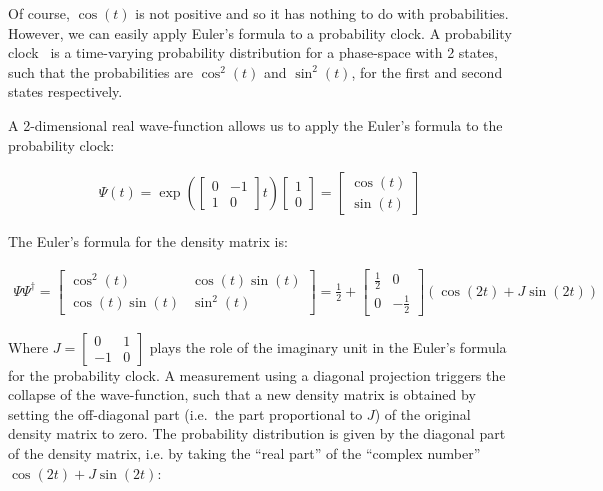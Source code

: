 \documentclass[11pt]{book}
\begin{document}
Of course, \(\cos(t)\) is not positive and so it has nothing to do with
probabilities. However, we can easily apply Euler's formula to a
probability clock. A probability
clock~\cite{Zhao2010Norm} is a
time-varying probability distribution for a phase-space with 2 states,
such that the probabilities are \(\cos^2(t)\) and \(\sin^2(t)\), for the
first and second states respectively.

A 2-dimensional real wave-function allows us to apply the Euler's
formula to the probability clock:

\begin{equation}\begin{aligned}
  \Psi(t)=\exp\left(\left[\begin{smallmatrix} 0 & -1\\ 1 & 0 \end{smallmatrix}\right] t\right)\left[\begin{smallmatrix} 1\\ 0 \end{smallmatrix}\right]=\left[\begin{smallmatrix} \cos(t)\\ \sin(t) \end{smallmatrix}\right]\end{aligned}\end{equation}

The Euler's formula for the density matrix is:

\begin{equation}\begin{aligned}
  \Psi \Psi^\dagger=\left[\begin{smallmatrix} \cos^2(t) & \cos(t)\sin(t)\\ \cos(t)\sin(t) & \sin^2(t) \end{smallmatrix}\right]=\frac{1}{2}+ \left[\begin{smallmatrix} \frac{1}{2} & 0\\ 0 & -\frac{1}{2} \end{smallmatrix}\right](\cos(2t) +J\sin(2t))\end{aligned}\end{equation}

Where
\(J=\left[\begin{smallmatrix} 0 & 1 \\ -1 & 0 \end{smallmatrix}\right]\)
plays the role of the imaginary unit in the Euler's formula for the
probability clock. A measurement using a diagonal projection triggers
the collapse of the wave-function, such that a new density matrix is
obtained by setting the off-diagonal part (i.e.~the part proportional to
\(J\)) of the original density matrix to zero. The probability
distribution is given by the diagonal part of the density matrix, i.e.
by taking the ``real part'' of the ``complex number''
\(\cos(2t) +J\sin(2t)\):
\end{document}
